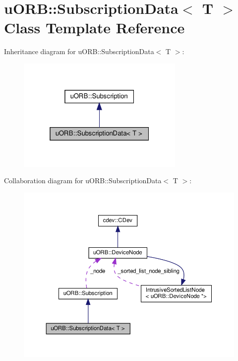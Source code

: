 \hypertarget{classuORB_1_1SubscriptionData}{}\section{u\+O\+RB\+:\+:Subscription\+Data$<$ T $>$ Class Template Reference}
\label{classuORB_1_1SubscriptionData}


Inheritance diagram for u\+O\+RB\+:\+:Subscription\+Data$<$ T $>$\+:\nopagebreak
\begin{figure}[H]
\begin{center}
\leavevmode
\includegraphics[width=229pt]{d0/d46/classuORB_1_1SubscriptionData__inherit__graph}
\end{center}
\end{figure}


Collaboration diagram for u\+O\+RB\+:\+:Subscription\+Data$<$ T $>$\+:\nopagebreak
\begin{figure}[H]
\begin{center}
\leavevmode
\includegraphics[width=350pt]{d6/d00/classuORB_1_1SubscriptionData__coll__graph}
\end{center}
\end{figure}
